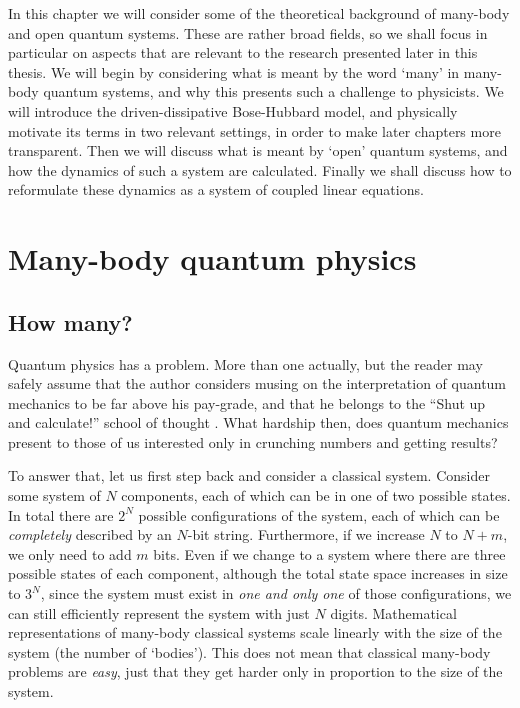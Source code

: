 In this chapter we will consider some of the theoretical background of many-body and open quantum systems. These are rather broad fields, so we shall focus in particular on aspects that are relevant to the research presented later in this thesis. We will begin by considering what is meant by the word `many' in many-body quantum systems, and why this presents such a challenge to physicists. We will introduce the driven-dissipative Bose-Hubbard model, and physically motivate its terms in two relevant settings, in order to make later chapters more transparent. Then we will discuss what is meant by `open' quantum systems, and how the dynamics of such a system are calculated. Finally we shall discuss how to reformulate these dynamics as a system of coupled linear equations.

\section{Many-body quantum physics}

\subsection{How many?}
Quantum physics has a problem. More than one actually, but the reader may safely assume that the author considers musing on the interpretation of quantum mechanics to be far above his pay-grade, and that he belongs to the ``Shut up and calculate!'' school of thought \cite{Mermin1989}. What hardship then, does quantum mechanics present to those of us interested only in crunching numbers and getting results?

To answer that, let us first step back and consider a classical system. Consider some system of \(N\) components, each of which can be in one of two possible states. In total there are \(2^{N}\) possible configurations of the system, each of which can be \emph{completely} described by an \(N\)-bit string. Furthermore, if we increase \(N\) to \(N+m\), we only need to add \(m\) bits. Even if we change to a system where there are three possible states of each component, although the total state space increases in size to \(3^{N}\), since the system must exist in \emph{one and only one} of those configurations, we can still efficiently represent the system with just \(N\) digits. Mathematical representations of many-body classical systems scale linearly with the size of the system (the number of `bodies'). This does not mean that classical many-body problems are \emph{easy}, just that they get harder only in proportion to the size of the system.

